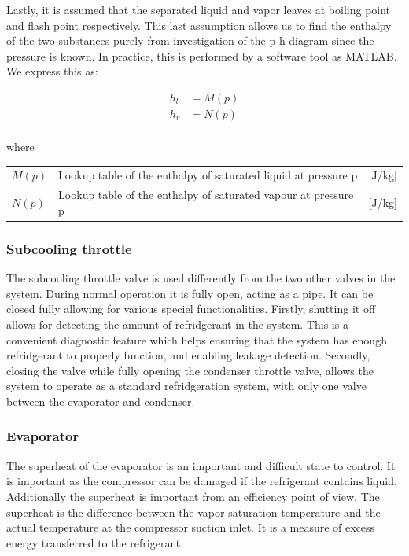 Lastly, it is assumed that the separated liquid and vapor leaves at boiling point and flash point respectively. This last assumption allows us to find the enthalpy of the two substances purely from investigation of the p-h diagram since the pressure is known. In practice, this is performed by a software tool as MATLAB. We express this as:

\begin{align}
	h_{l}  & = M(p)\\
	h_{v}  & = N(p)\\
\end{align}

where

\begin{center}
	\begin{tabular}{l p{8cm} l}
		$M(p)$			&  Lookup table of the enthalpy of saturated liquid	at pressure p		& [\si{J}/\si{kg}]\\
		$N(p)$			&  Lookup table of the enthalpy of saturated vapour	at pressure p		& [\si{J}/\si{kg}] \\

	\end{tabular}
\end{center}

\subsubsection{Subcooling throttle}
The subcooling throttle valve is used differently from the two other valves in the system. During normal operation it is fully open, acting as a pipe. It can be closed fully allowing for various speciel functionalities. Firstly, shutting it off allows for detecting the amount of refridgerant in the system. This is a convenient diagnostic feature which helps ensuring that the system has enough refridgerant to properly function, and enabling leakage detection. Secondly, closing the valve while fully opening the condenser throttle valve, allows the system to operate as a standard refridgeration system, with only one valve between the evaporator and condenser.


\subsubsection{Evaporator}
The superheat of the evaporator is an important and difficult state to control. It is important as the compressor can be damaged if the refrigerant contains liquid. Additionally the superheat is important from an efficiency point of view.
The superheat is the difference between the vapor saturation temperature and the actual temperature at the compressor suction inlet. It is a measure of excess energy transferred to the refrigerant.

